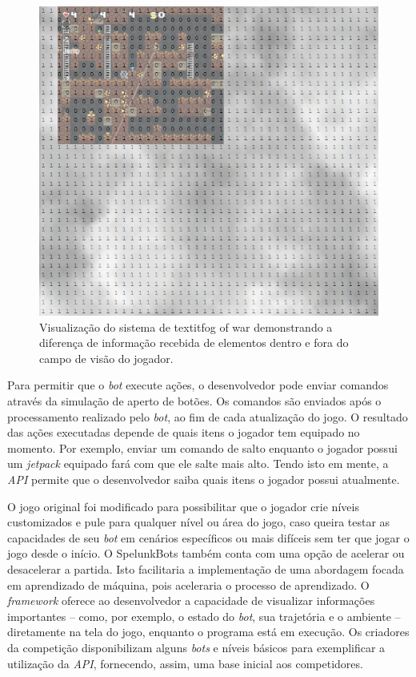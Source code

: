 \begin{figure}[htb!]
\centering
\includegraphics[width=.65\textwidth]{fig/spelunkbots-fow.png}
\caption {\label{fig:spelunkbots-fow}Visualização do sistema de textit{fog of
war} demonstrando a diferença de informação recebida de elementos dentro e fora
do campo de visão do jogador.}
\end{figure}

Para permitir que o \textit{bot} execute ações, o desenvolvedor pode enviar
comandos através da simulação de aperto de botões. Os comandos são enviados após
o processamento realizado pelo \textit{bot}, ao fim de cada atualização do jogo.
O resultado das ações executadas depende de quais itens o jogador tem equipado
no momento. Por exemplo, enviar um comando de salto enquanto o jogador possui um
\textit{jetpack} equipado fará com que ele salte mais alto. Tendo isto em mente,
a \textit{API} permite que o desenvolvedor saiba quais itens o jogador possui
atualmente.

O jogo original foi modificado para possibilitar que o jogador crie níveis
customizados e pule para qualquer nível ou área do jogo, caso queira testar as
capacidades de seu \textit{bot} em cenários específicos ou mais difíceis sem ter
que jogar o jogo desde o início. O SpelunkBots também conta com uma opção de
acelerar ou desacelerar a partida. Isto facilitaria a implementação de uma
abordagem focada em aprendizado de máquina, pois aceleraria o processo de
aprendizado. O \textit{framework} oferece ao desenvolvedor a capacidade de
visualizar informações importantes -- como, por exemplo, o estado do
\textit{bot}, sua trajetória e o ambiente -- diretamente na tela do jogo,
enquanto o programa está em execução. Os criadores da competição disponibilizam
alguns \textit{bots} e níveis básicos para exemplificar a utilização da
\textit{API}, fornecendo, assim, uma base inicial aos competidores.

